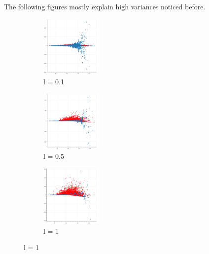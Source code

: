 \documentclass[english,11pt,openany]{report}
\theoremstyle{definition}
\theoremstyle{plain}
\theoremstyle{definition}
\begin{document}
The following figures mostly explain high variances noticed before.

\begin{figure}[H]
	\centering
	\begin{subfigure}[t]{0.3\textwidth}
		\includegraphics[width=30mm]{kernel_regression/l=01.png}
		\caption{l = 0.1}
		\label{fig:a} %
	\end{subfigure}
	\begin{subfigure}[t]{0.3\textwidth}
		\includegraphics[width=30mm]{kernel_regression/l=05.png}
		\caption{l = 0.5}
		\label{fig:b}
	\end{subfigure}
	\begin{subfigure}[t]{0.3\textwidth}
		\includegraphics[width=30mm]{kernel_regression/l=1.png}
		\caption{l = 1}
		\label{fig:c}
	\end{subfigure}



\end{figure}
\end{document}
